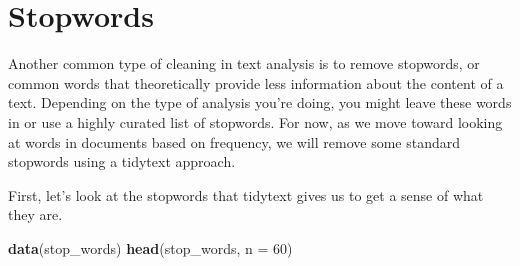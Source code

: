 \documentclass[]{book}
\newenvironment{Shaded}{\begin{snugshade}}{\end{snugshade}}
\newcommand{\CommentTok}[1]{\textcolor[rgb]{0.56,0.35,0.01}{\textit{#1}}}
\newcommand{\DataTypeTok}[1]{\textcolor[rgb]{0.13,0.29,0.53}{#1}}
\newcommand{\DecValTok}[1]{\textcolor[rgb]{0.00,0.00,0.81}{#1}}
\newcommand{\KeywordTok}[1]{\textcolor[rgb]{0.13,0.29,0.53}{\textbf{#1}}}
\newcommand{\NormalTok}[1]{#1}
\newcommand{\OperatorTok}[1]{\textcolor[rgb]{0.81,0.36,0.00}{\textbf{#1}}}
\newcommand{\OtherTok}[1]{\textcolor[rgb]{0.56,0.35,0.01}{#1}}
\newcommand{\StringTok}[1]{\textcolor[rgb]{0.31,0.60,0.02}{#1}}
\begin{document}
\begin{Shaded}
\end{Shaded}

\hypertarget{stopwords}{%
\section{Stopwords}\label{stopwords}}

Another common type of cleaning in text analysis is to remove stopwords, or common words that theoretically provide less information about the content of a text. Depending on the type of analysis you're doing, you might leave these words in or use a highly curated list of stopwords. For now, as we move toward looking at words in documents based on frequency, we will remove some standard stopwords using a tidytext approach.

First, let's look at the stopwords that tidytext gives us to get a sense of what they are.

\begin{Shaded}
\begin{Highlighting}[]
\KeywordTok{data}\NormalTok{(stop_words)}
\KeywordTok{head}\NormalTok{(stop_words, }\DataTypeTok{n =} \DecValTok{60}\NormalTok{)}
\end{Highlighting}
\end{Shaded}
\end{document}
